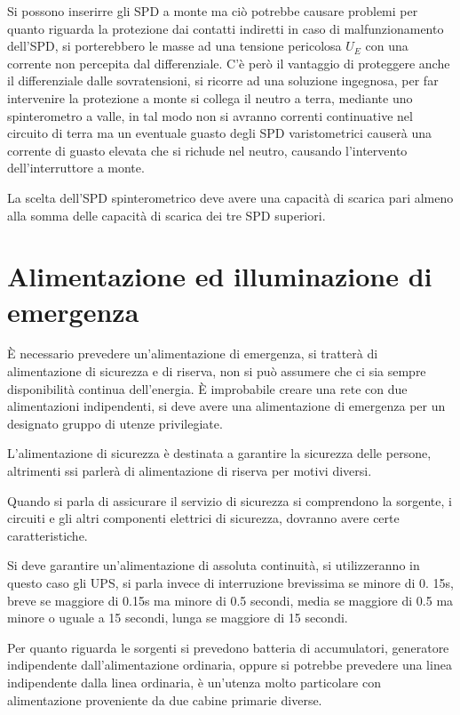
Si possono inserirre gli SPD a monte ma ciò potrebbe causare problemi per 
quanto riguarda la protezione dai contatti indiretti in caso di 
malfunzionamento dell'SPD, si porterebbero le masse ad una tensione pericolosa 
$U_E$ con una corrente non percepita dal differenziale.
C'è però il vantaggio di proteggere anche il differenziale dalle sovratensioni, 
si ricorre ad una soluzione ingegnosa, per far intervenire la protezione a 
monte si collega il neutro a terra, mediante uno spinterometro a valle, in tal 
modo non si avranno correnti continuative nel circuito di terra ma un eventuale 
guasto degli SPD varistometrici causerà una corrente di guasto elevata che si 
richude nel neutro, causando l'intervento dell'interruttore a monte.

La scelta dell'SPD spinterometrico deve avere una capacità di scarica pari 
almeno alla somma delle capacità di scarica dei tre SPD superiori.

\section{Alimentazione ed illuminazione di emergenza}

È necessario prevedere un'alimentazione di emergenza, si tratterà di 
alimentazione di sicurezza e di riserva, non si può assumere che ci sia sempre 
disponibilità continua dell'energia. È improbabile creare una rete con due 
alimentazioni indipendenti, si deve avere una alimentazione di emergenza per un 
designato gruppo di utenze privilegiate.

L'alimentazione di sicurezza è destinata a garantire la sicurezza delle 
persone, altrimenti ssi parlerà di alimentazione di riserva per motivi diversi.

Quando si parla di assicurare il servizio di sicurezza si comprendono la 
sorgente, i circuiti e gli altri componenti elettrici di sicurezza, dovranno 
avere certe caratteristiche.

Si deve garantire un'alimentazione di assoluta continuità, si utilizzeranno in 
questo caso gli UPS, si parla invece di interruzione brevissima se minore di 0.
15s, breve se maggiore di 0.15s ma minore di 0.5 secondi, media se maggiore di 
0.5 ma minore o uguale a 15 secondi, lunga se maggiore di 15 secondi.


Per quanto riguarda le sorgenti si prevedono batteria di accumulatori, 
generatore indipendente dall'alimentazione ordinaria, oppure si potrebbe 
prevedere una linea indipendente dalla linea ordinaria, è un'utenza molto 
particolare con alimentazione proveniente da due cabine primarie diverse.

